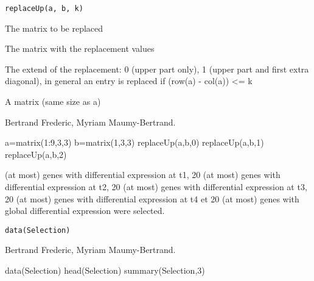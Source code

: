 \documentclass[a4paper]{book}
\begin{document}
%
\begin{Usage}
\begin{verbatim}
replaceUp(a, b, k)
\end{verbatim}
\end{Usage}
%
\begin{Arguments}
\begin{ldescription}
\item[\code{a}] The matrix to be replaced
\item[\code{b}] The matrix with the replacement values
\item[\code{k}] The extend of the replacement: 0 (upper part only), 1 (upper part and first extra diagonal), in general an entry is replaced if (row(a) - col(a)) <= k
\end{ldescription}
\end{Arguments}
%
\begin{Value}
A matrix (same size as a) 
\end{Value}
%
\begin{Author}\relax
Bertrand Frederic, Myriam Maumy-Bertrand.
\end{Author}
%
\begin{Examples}
\begin{ExampleCode}
a=matrix(1:9,3,3)
b=matrix(1,3,3)
replaceUp(a,b,0)
replaceUp(a,b,1)
replaceUp(a,b,2)
\end{ExampleCode}
\end{Examples}
%
\begin{Description} (at most) genes with differential expression at t1, 20 (at most) genes with differential expression at t2, 20 (at most) genes with differential expression at t3, 20 (at most) genes with differential expression at t4 et 20 (at most) genes with global differential expression were selected.
\end{Description}
%
\begin{Usage}
\begin{verbatim}
data(Selection)
\end{verbatim}
\end{Usage}
%
\begin{Author}\relax
Bertrand Frederic, Myriam Maumy-Bertrand.
\end{Author}
%
\begin{Examples}
\begin{ExampleCode}
data(Selection)
head(Selection)
summary(Selection,3)
\end{ExampleCode}
\end{Examples}
\end{document}
